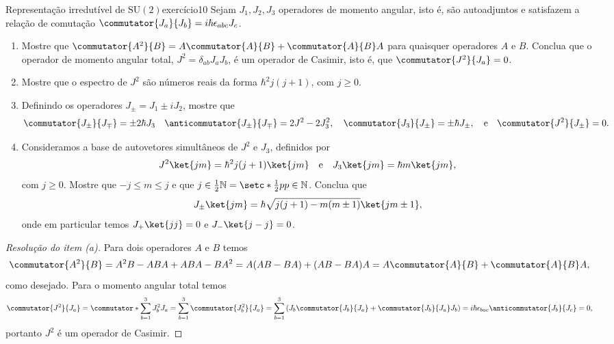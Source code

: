 \begin{exercício}{Representação irredutível de \(\mathrm{SU}(2)\)}{exercício10}
    Sejam \(J_1, J_2, J_3\) operadores de momento angular, isto é, são autoadjuntos e satisfazem a relação de comutação \(\commutator{J_a}{J_b} = i \hbar \epsilon_{abc} J_c\).
    \begin{enumerate}[label=(\alph*)]
        \item Mostre que \(\commutator{A^2}{B} = A\commutator{A}{B} + \commutator{A}{B}A\) para quaisquer operadores \(A\) e \(B\). Conclua que o operador de momento angular total, \(J^2 = \delta_{ab} J_{a}J_{b}\), é um operador de Casimir, isto é, que \(\commutator{J^2}{J_a} = 0\).
        \item Mostre que o espectro de \(J^2\) são números reais da forma \(\hbar^2 j (j + 1)\), com \(j \geq 0\).
        \item Definindo os operadores \(J_\pm = J_1 \pm i J_2\), mostre que
            \begin{equation*}
                \commutator{J_\pm}{J_\mp} = \pm 2\hbar J_3\quad
                \anticommutator{J_\pm}{J_\mp} = 2J^2 - 2J_3^2,\quad
                \commutator{J_3}{J_\pm} = \pm \hbar J_\pm,\quad\text{e}\quad
                \commutator{J^2}{J_\pm} = 0.
            \end{equation*}
        \item Consideramos a base de autovetores simultâneos de \(J^2\) e \(J_3\), definidos por
            \begin{equation*}
                J^2 \ket{jm} = \hbar^2 j(j+1)\ket{jm}\quad\text{e}\quad J_3 \ket{jm} = \hbar m \ket{jm},
            \end{equation*}
            com \(j \geq 0\). Mostre que \(-j \leq m \leq j\) e que \(j \in \frac12 \mathbb{N} = \setc*{\frac12 p}{p \in \mathbb{N}}\). Conclua que
            \begin{equation*}
                J_\pm \ket{jm} = \hbar \sqrt{j(j+1) - m(m\pm1)} \ket{jm\pm1},
            \end{equation*}
            onde em particular temos \(J_+ \ket{jj} = 0\) e \(J_- \ket{j-j} = 0\).
    \end{enumerate}
\end{exercício}
\begin{proof}[Resolução do item (a)]
    Para dois operadores \(A\) e \(B\) temos
    \begin{equation*}
        \commutator{A^2}{B} = A^2 B - ABA + ABA - BA^2 = A(AB - BA) + (AB - BA)A = A\commutator{A}{B} + \commutator{A}{B}A,
    \end{equation*}
    como desejado. Para o momento angular total temos
    \begin{equation*}
        \commutator{J^2}{J_a} = \commutator*{\sum_{b = 1}^3 J_b^2}{J_a} = \sum_{b = 1}^3\commutator{J_b^2}{J_a} = \sum_{b = 1}^3 \left(J_b\commutator{J_b}{J_a} + \commutator{J_b}{J_a}J_b\right) = i \hbar\epsilon_{bac} \anticommutator{J_b}{J_c} = 0,
    \end{equation*}
    portanto \(J^2\) é um operador de Casimir.
\end{proof}
